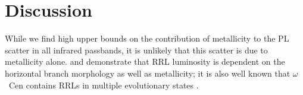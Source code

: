 \documentclass[a4paper,fleqn,usenatbib]{mnras}
\begin{document}
\section{Discussion}
\label{sec:discussion}

While we find high upper bounds on the contribution of metallicity to the PL scatter in all infrared passbands, it is unlikely that this scatter is due to metallicity alone. \citet{1986A&A...169..111G} and \citet{1991ApJ...373L..43L} demonstrate that RRL luminosity is dependent on the horizontal branch morphology as well as metallicity; it is also well known that $\omega$~Cen contains RRLs in multiple evolutionary states \citep{2008MmSAI..79..342S, 2015A&A...577A..99N}.
\end{document}
